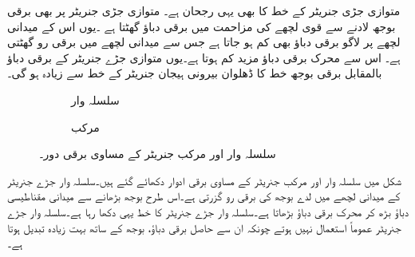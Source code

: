 متوازی جڑی جنریٹر کے خط کا بھی یہی رجحان ہے۔ متوازی جڑی جنریٹر پر بھی برقی بوجھ لادنے سے قوی لچھے کی مزاحمت میں برقی دباؤ گھٹتا ہے ۔یوں اس کے میدانی لچھے پر لاگو برقی دباؤ بھی کم ہو جاتا ہے جس سے میدانی لچھے میں برقی رو گھٹتی ہے۔ اس سے محرک برقی دباؤ مزید کم ہوتا ہے۔یوں متوازی جڑے جنریٹر کے برقی دباؤ بالمقابل برقی بوجھ  خط کا ڈھلوان بیرونی ہیجان جنریٹر کے خط سے زیادہ ہو گی۔
\begin{figure}
\centering
\begin{subfigure}{0.40\textwidth}
\centering
{}
\caption{سلسلہ وار}
\end{subfigure}\hfill
\begin{subfigure}{0.50\textwidth}
\centering
{}
\caption{مرکب}
\end{subfigure}
\caption{سلسلہ وار اور مرکب جنریٹر کے مساوی برقی دور۔}
\label{شکل_یکسمتی_سلسلہ_وار_اور_مرکب_مساوی}
\end{figure}

شکل   میں سلسلہ وار اور مرکب جنریٹر کے مساوی برقی ادوار دکھائے گئے ہیں۔سلسلہ وار جڑے جنریٹر کے میدانی لچھے میں لدے  بوجھ کی برقی رو  گزرتی ہے۔اس طرح بوجھ بڑھانے سے میدانی مقناطیسی دباؤ  بڑھ کر محرک برقی دباؤ بڑھاتا ہے۔سلسلہ وار جڑے جنریٹر کا خط یہی دکھا رہا ہے۔سلسلہ وار جڑے جنریٹر عموماً استعمال نہیں ہوتے چونکہ ان سے حاصل برقی دباؤ، بوجھ کے ساتھ بہت زیادہ تبدیل ہوتا ہے۔ 

